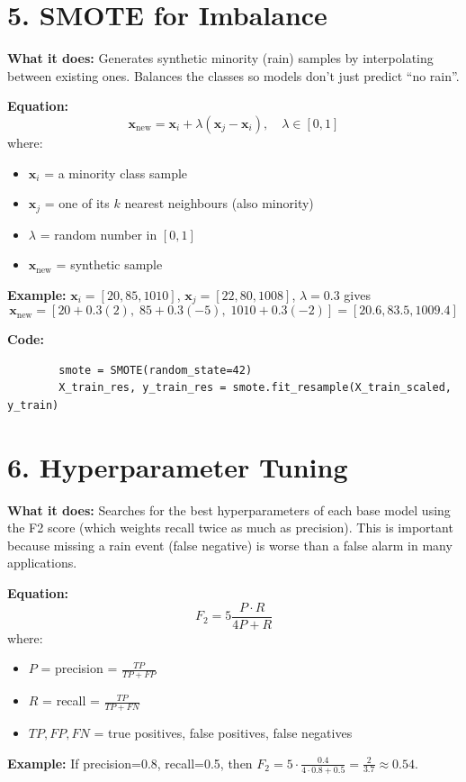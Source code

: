 \documentclass[12pt]{article}
\begin{document}
	\section*{5. SMOTE for Imbalance}
	\textbf{What it does:} Generates synthetic minority (rain) samples by interpolating between existing ones. Balances the classes so models don't just predict “no rain”.
	
	\textbf{Equation:}
	\[
	\mathbf{x}_{\text{new}} = \mathbf{x}_i + \lambda(\mathbf{x}_j-\mathbf{x}_i),\quad \lambda\in[0,1]
	\]
	where:
	\begin{itemize}
		\item $\mathbf{x}_i$ = a minority class sample
		\item $\mathbf{x}_j$ = one of its $k$ nearest neighbours (also minority)
		\item $\lambda$ = random number in $[0,1]$
		\item $\mathbf{x}_{\text{new}}$ = synthetic sample
	\end{itemize}
	
	\textbf{Example:} $\mathbf{x}_i=[20,85,1010]$, $\mathbf{x}_j=[22,80,1008]$, $\lambda=0.3$ gives
	\[
	\mathbf{x}_{\text{new}} = [20+0.3(2),\;85+0.3(-5),\;1010+0.3(-2)] = [20.6,83.5,1009.4]
	\]
	
	\textbf{Code:}
	\begin{lstlisting}
		smote = SMOTE(random_state=42)
		X_train_res, y_train_res = smote.fit_resample(X_train_scaled, y_train)
	\end{lstlisting}
	
	\section*{6. Hyperparameter Tuning}
	\textbf{What it does:} Searches for the best hyperparameters of each base model using the F2 score (which weights recall twice as much as precision). This is important because missing a rain event (false negative) is worse than a false alarm in many applications.
	
	\textbf{Equation:}
	\[
	F_2 = 5\frac{P\cdot R}{4P + R}
	\]
	where:
	\begin{itemize}
		\item $P$ = precision = $\frac{TP}{TP+FP}$
		\item $R$ = recall = $\frac{TP}{TP+FN}$
		\item $TP, FP, FN$ = true positives, false positives, false negatives
	\end{itemize}
	
	\textbf{Example:} If precision=0.8, recall=0.5, then $F_2 = 5\cdot\frac{0.4}{4\cdot0.8+0.5}= \frac{2}{3.7}\approx 0.54$.
	
\end{document}
